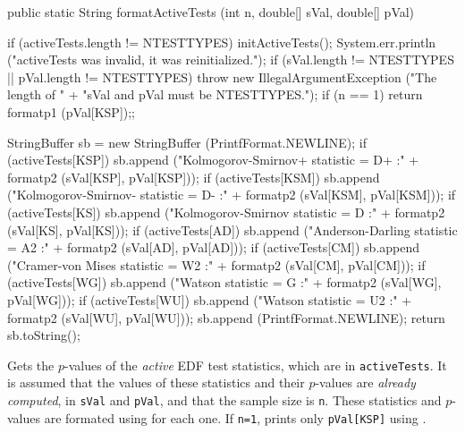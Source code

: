 \begin{code}

   public static String formatActiveTests (int n, double[] sVal,
                                           double[] pVal)\begin{hide} {

      if (activeTests.length != NTESTTYPES) {
        initActiveTests();
        System.err.println ("activeTests was invalid, it was reinitialized.");
      }
      if (sVal.length != NTESTTYPES || pVal.length != NTESTTYPES)
        throw new IllegalArgumentException ("The length of " +
           "sVal and pVal must be NTESTTYPES.");
      if (n == 1)
         return formatp1 (pVal[KSP]);;

      StringBuffer sb = new StringBuffer (PrintfFormat.NEWLINE);
      if (activeTests[KSP])
         sb.append ("Kolmogorov-Smirnov+ statistic = D+    :" +
           formatp2 (sVal[KSP], pVal[KSP]));
      if (activeTests[KSM])
         sb.append ("Kolmogorov-Smirnov- statistic = D-    :" +
           formatp2 (sVal[KSM], pVal[KSM]));
      if (activeTests[KS])
         sb.append ("Kolmogorov-Smirnov statistic  = D     :" +
           formatp2 (sVal[KS], pVal[KS]));
      if (activeTests[AD])
         sb.append ("Anderson-Darling statistic = A2       :" +
           formatp2 (sVal[AD], pVal[AD]));
      if (activeTests[CM])
         sb.append ("Cramer-von Mises statistic = W2       :" +
           formatp2 (sVal[CM], pVal[CM]));
      if (activeTests[WG])
         sb.append ("Watson statistic = G                  :" +
           formatp2 (sVal[WG], pVal[WG]));
      if (activeTests[WU])
         sb.append ("Watson statistic = U2                 :" +
           formatp2 (sVal[WU], pVal[WU]));
      sb.append (PrintfFormat.NEWLINE);
      return sb.toString();
   }\end{hide}
\end{code}
\begin{tabb} Gets the $p$-values of the {\em active\/} EDF test statistics,
  which are in \texttt{activeTests}.  It is assumed that the values
  of these statistics and their $p$-values are {\em already computed},
  in \texttt{sVal} and \texttt{pVal}, and that the sample size is \texttt{n}.
  These statistics and $p$-values are formated
  using  for each one.
  If \texttt{n=1}, prints only \texttt{pVal[KSP]} using .
\end{tabb}
